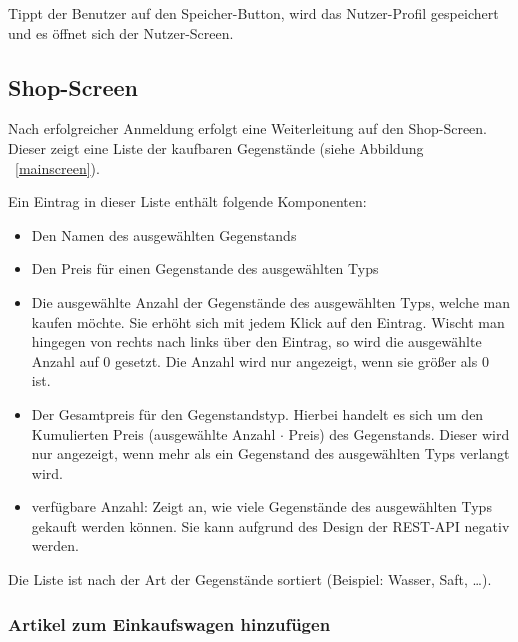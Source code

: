 Tippt der Benutzer auf den Speicher-Button, wird das Nutzer-Profil gespeichert und es öffnet sich der Nutzer-Screen.

\subsection{Shop-Screen}\label{subsec:shop-screen}

Nach erfolgreicher Anmeldung erfolgt eine Weiterleitung auf den Shop-Screen.
Dieser zeigt eine Liste der kaufbaren Gegenstände (siehe Abbildung ~\ref{mainscreen}).


Ein Eintrag in dieser Liste enthält folgende Komponenten:

\begin{itemize}
	\item Den Namen des ausgewählten Gegenstands

	\item Den Preis für einen Gegenstande des ausgewählten Typs

	\item Die ausgewählte Anzahl der Gegenstände des ausgewählten Typs, welche man kaufen möchte.
	Sie erhöht sich mit jedem Klick auf den Eintrag.
	Wischt man hingegen von rechts nach links über den Eintrag, so wird die ausgewählte Anzahl auf 0 gesetzt.
	Die Anzahl wird nur angezeigt, wenn sie größer als 0 ist.

	\item Der Gesamtpreis für den Gegenstandstyp.
	Hierbei handelt es sich um den Kumulierten Preis (ausgewählte Anzahl $\cdot$ Preis) des Gegenstands.
	Dieser wird nur angezeigt, wenn mehr als ein Gegenstand des ausgewählten Typs verlangt wird.

	\item verfügbare Anzahl: Zeigt an, wie viele Gegenstände des ausgewählten Typs gekauft werden können.
	Sie kann aufgrund des Design der REST-API negativ werden.
\end{itemize}

Die Liste ist nach der Art der Gegenstände sortiert (Beispiel: Wasser, Saft, \ldots).

\subsubsection{Artikel zum Einkaufswagen hinzufügen} \label{subsubsec:shoppingcart-add-item}

